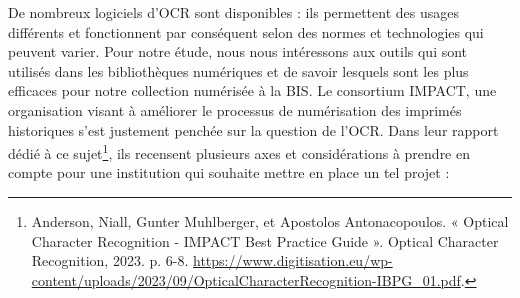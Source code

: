 \documentclass[a4paper,12pt,twoside]{book}
\begin{document}
De nombreux logiciels d'OCR sont disponibles : ils permettent des usages
différents et fonctionnent par conséquent selon des normes et
technologies qui peuvent varier. Pour notre étude, nous nous intéressons
aux outils qui sont utilisés dans les bibliothèques numériques et de
savoir lesquels sont les plus efficaces pour notre collection numérisée
à la BIS. Le consortium IMPACT, une organisation visant à améliorer le
processus de numérisation des imprimés historiques s'est justement
penchée sur la question de l'OCR. Dans leur rapport dédié à ce
sujet\footnote{Anderson, Niall, Gunter Muhlberger, et Apostolos
	Antonacopoulos. « Optical Character Recognition - IMPACT Best Practice
	Guide ». Optical Character Recognition, 2023. p. 6-8.
	\url{https://www.digitisation.eu/wp-content/uploads/2023/09/OpticalCharacterRecognition-IBPG_01.pdf}.},
ils recensent plusieurs axes et considérations à prendre en compte pour
une institution qui souhaite mettre en place un tel projet : \\
\end{document}
